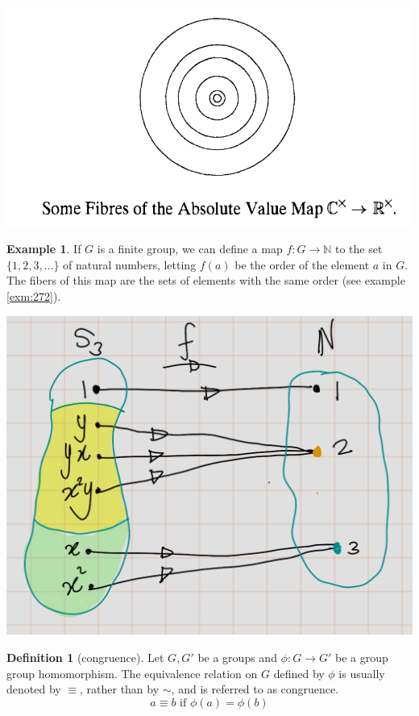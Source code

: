 \documentclass[
]{book}
\theoremstyle{definition}
\newtheorem{definition}{Definition}[chapter]
\theoremstyle{definition}
\newtheorem{example}{Example}[chapter]
\theoremstyle{definition}
\theoremstyle{definition}
\theoremstyle{remark}
\begin{document}
\includegraphics{figures/ch_2/fig33.png}

\begin{example}
\protect\hypertarget{exm:unnamed-chunk-30}{}\label{exm:unnamed-chunk-30}If \(G\) is a finite group, we can define a map \(f : G \to \mathbb{N}\) to the set \(\{1, 2, 3, \ldots\}\) of natural numbers, letting \(f(a)\) be the order of the element \(a\) in \(G\). The fibers of this map are the sets of elements with the same order (see example \ref{exm:272}).
\end{example}

\includegraphics{figures/ch_2/fig34.png}

\begin{definition}[congruence]
\protect\hypertarget{def:unnamed-chunk-31}{}\label{def:unnamed-chunk-31}Let \(G,G'\) be a groups and \(\phi: G \rightarrow G'\) be a group group homomorphism. The equivalence relation on \(G\) defined by \(\phi\) is usually denoted by \(\equiv\), rather than by \(\sim\), and is referred to as congruence.
\[a \equiv b \text{ if }\phi(a) = \phi(b)\]
\end{definition}
\end{document}
